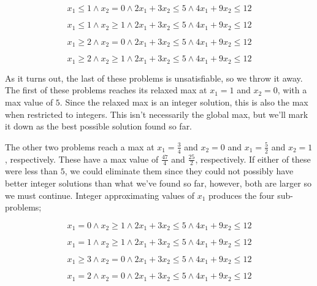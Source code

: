 \begin{equation}
    x_1 \leq 1 \wedge x_2 = 0 \wedge 2x_1 + 3x_2 \leq 5 \wedge 4x_1 + 9x_2 \leq 12
\end{equation}

\begin{equation}
    x_1 \leq 1 \wedge x_2 \geq 1 \wedge 2x_1 + 3x_2 \leq 5 \wedge 4x_1 + 9x_2 \leq 12
\end{equation}

\begin{equation}
    x_1 \geq 2 \wedge x_2 = 0 \wedge 2x_1 + 3x_2 \leq 5 \wedge 4x_1 + 9x_2 \leq 12
\end{equation}

\begin{equation}
    x_1 \geq 2 \wedge x_2 \geq 1 \wedge 2x_1 + 3x_2 \leq 5 \wedge 4x_1 + 9x_2 \leq 12
\end{equation}

As it turns out, the last of these problems is unsatisfiable, so we throw it away. The first of these problems reaches its relaxed max at $x_1 = 1$ and $x_2 = 0$, with a max value of $5$. Since the relaxed max is an integer solution, this is also the max when restricted to integers. This isn't necessarily the global max, but we'll mark it down as the best possible solution found so far.

The other two problems reach a max at $x_1 = \frac{3}{4}$ and $x_2 = 0$ and $x_1 = \frac{5}{2}$ and $x_2 = 1$, respectively. These have a max value of $\frac{47}{4}$ and $\frac{25}{2}$, respectively. If either of these were less than $5$, we could eliminate them since they could not possibly have better integer solutions than what we've found so far, however, both are larger so we must continue. Integer approximating values of $x_1$ produces the four sub-problems;

\begin{equation}
    x_1 = 0 \wedge x_2 \geq 1 \wedge 2x_1 + 3x_2 \leq 5 \wedge 4x_1 + 9x_2 \leq 12
\end{equation}

\begin{equation}
    x_1 = 1 \wedge x_2 \geq 1 \wedge 2x_1 + 3x_2 \leq 5 \wedge 4x_1 + 9x_2 \leq 12
\end{equation}

\begin{equation}
    x_1 \geq 3 \wedge x_2 = 0 \wedge 2x_1 + 3x_2 \leq 5 \wedge 4x_1 + 9x_2 \leq 12
\end{equation}

\begin{equation}
    x_1 = 2 \wedge x_2 = 0 \wedge 2x_1 + 3x_2 \leq 5 \wedge 4x_1 + 9x_2 \leq 12
\end{equation}

